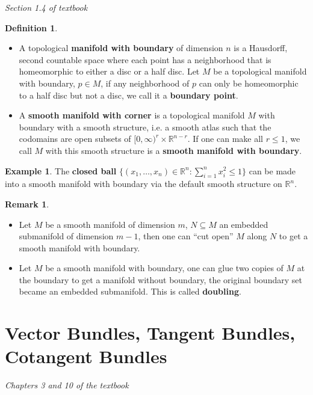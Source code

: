 \documentclass{article}
\theoremstyle{definition}
\newtheorem{dfn}[thm]{Definition}
\newtheorem{rmk}[thm]{Remark}
\newtheorem{exm}[thm]{Example}
\begin{document}
{\em Section 1.4 of textbook}

\begin{dfn}
    \begin{itemize}
        \item A topological {\bf manifold with boundary} of dimension $n$ is a Hausdorff, second countable space where each point has a neighborhood that is homeomorphic to either a disc or a half disc. Let $M$ be a topological manifold with boundary, $p\in M$, if any neighborhood of $p$ can only be homeomorphic to a half disc but not a disc, we call it a {\bf boundary point}. 
        \item A {\bf smooth manifold with corner} is a topological manifold $M$ with boundary with a smooth structure, i.e. a smooth atlas such that the codomains are open subsets of $[0, \infty)^r\times\mathbb{R}^{n-r}$. If one can make all $r\leq 1$, we call $M$ with this smooth structure is a {\bf smooth manifold with boundary}.
    \end{itemize}
\end{dfn}

\begin{exm}
    The {\bf closed ball} $\{(x_1, \dots, x_n)\in\mathbb{R}^n:\sum_{i=1}^n x_i^2\leq 1\}$ can be made into a smooth manifold with boundary via the default smooth structure on $\mathbb{R}^n$.
\end{exm}

\begin{rmk}
    \begin{itemize}
        \item Let $M$ be a smooth manifold of dimension $m$, $N\subseteq M$ an embedded submanifold of dimension $m-1$, then one can ``cut open'' $M$ along $N$ to get a smooth manifold with boundary.
        \item Let $M$ be a smooth manifold with boundary, one can glue two copies of $M$ at the boundary to get a manifold without boundary, the original boundary set became an embedded submanifold. This is called {\bf doubling}.
    \end{itemize}
\end{rmk}

\newpage

\section{Vector Bundles, Tangent Bundles, Cotangent Bundles}

{\em Chapters 3 and 10 of the textbook}\\
\end{document}
